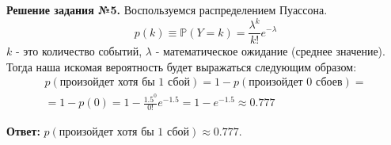 \documentclass[a4paper, 12pt]{article}
\begin{document}
\vspace{0.5cm}

\textbf{Решение задания №5.} Воспользуемся распределением Пуассона.
\[
    p(k) \equiv \mathbb{P}(Y = k) = \frac{\lambda ^ k}{k!}e^{-\lambda}
\]
$k$ - это количество событий, $\lambda$ - математическое ожидание (среднее значение). Тогда наша искомая вероятность будет выражаться следующим образом:
\begin{gather*}
    p(\text{произойдет хотя бы 1 сбой}) = 1 - p(\text{произойдет 0 сбоев}) = \\ 
    = 1 - p(0) = 1 - \frac{1.5 ^ 0}{0!}e^{-1.5} = 1 - e^{-1.5} \approx 0.777
\end{gather*}


\textbf{Ответ:} $p(\text{произойдет хотя бы 1 сбой}) \approx 0.777$.
\end{document}
